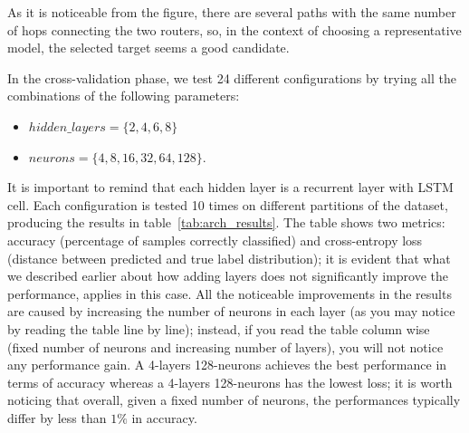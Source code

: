 As it is noticeable from the figure, there are several paths with the same number of hops connecting the two routers, so, in the context of choosing a representative model, the selected target seems a good candidate.

In the cross-validation phase, we test 24 different configurations by trying all the combinations of the following parameters:
\begin{itemize}
\item $hidden\_layers=\{2,4,6,8\}$
\item $neurons=\{4, 8,16,32,64,128\}$.
\end{itemize}

It is important to remind that each hidden layer is a recurrent layer with LSTM cell.
Each configuration is tested 10 times on different partitions of the dataset, producing the results in table~\ref{tab:arch_results}. The table shows two metrics: accuracy (percentage of samples correctly classified) and cross-entropy loss (distance between predicted and true label distribution); it is evident that what we described earlier about how adding layers does not significantly improve the performance, applies in this case. All the noticeable improvements in the results are caused by increasing the number of neurons in each layer (as you may notice by reading the table line by line); instead, if you read the table column wise (fixed number of neurons and increasing number of layers), you will not notice any performance gain. A 4-layers 128-neurons achieves the best performance in terms of accuracy whereas a 4-layers 128-neurons has the lowest loss; it is worth noticing that overall, given a fixed number of neurons, the performances typically differ by less than $1\%$ in accuracy. 

